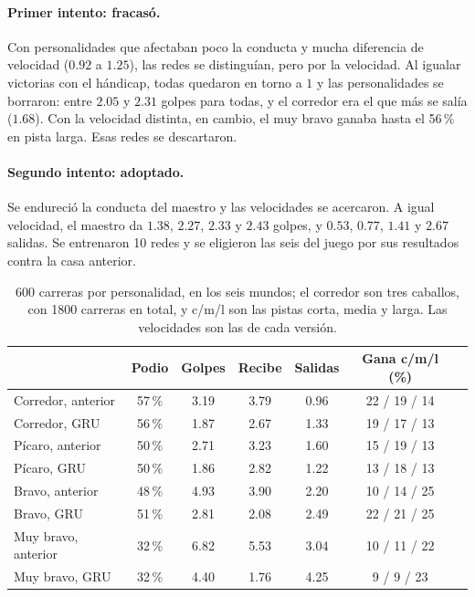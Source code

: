 \documentclass[11pt,letterpaper]{article}
\begin{document}
\paragraph{Primer intento: fracasó.} Con personalidades que afectaban poco la conducta y mucha diferencia de velocidad ($0.92$ a $1.25$), las redes se distinguían, pero por la velocidad. Al igualar victorias con el hándicap, todas quedaron en torno a $1$ y las personalidades se borraron: entre $2.05$ y $2.31$ golpes para todas, y el corredor era el que más se salía ($1.68$). Con la velocidad distinta, en cambio, el muy bravo ganaba hasta el 56\,\% en pista larga. Esas redes se descartaron.

\paragraph{Segundo intento: adoptado.} Se endureció la conducta del maestro y las velocidades se acercaron. A igual velocidad, el maestro da $1.38$, $2.27$, $2.33$ y $2.43$ golpes, y $0.53$, $0.77$, $1.41$ y $2.67$ salidas. Se entrenaron 10 redes y se eligieron las seis del juego por sus resultados contra la casa anterior.

\begin{table}[h]\centering\small
\begin{tabular}{lcccccc}
\toprule
 & Podio & Golpes & Recibe & Salidas & Gana c/m/l (\%) \\
\midrule
Corredor, anterior & 57\,\% & 3.19 & 3.79 & 0.96 & 22 / 19 / 14 \\
Corredor, GRU & 56\,\% & 1.87 & 2.67 & 1.33 & 19 / 17 / 13 \\
\midrule
Pícaro, anterior & 50\,\% & 2.71 & 3.23 & 1.60 & 15 / 19 / 13 \\
Pícaro, GRU & 50\,\% & 1.86 & 2.82 & 1.22 & 13 / 18 / 13 \\
\midrule
Bravo, anterior & 48\,\% & 4.93 & 3.90 & 2.20 & 10 / 14 / 25 \\
Bravo, GRU & 51\,\% & 2.81 & 2.08 & 2.49 & 22 / 21 / 25 \\
\midrule
Muy bravo, anterior & 32\,\% & 6.82 & 5.53 & 3.04 & 10 / 11 / 22 \\
Muy bravo, GRU & 32\,\% & 4.40 & 1.76 & 4.25 & 9 / 9 / 23 \\
\bottomrule
\end{tabular}
\caption{600 carreras por personalidad, en los seis mundos; el corredor son tres caballos, con 1800 carreras en total, y c/m/l son las pistas corta, media y larga. Las velocidades son las de cada versión.}
\end{table}
\end{document}
